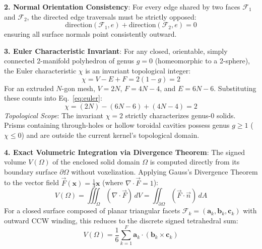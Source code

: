\textbf{2. Normal Orientation Consistency}: For every edge shared by two faces $\mathcal{F}_1$ and $\mathcal{F}_2$, the directed edge traversals must be strictly opposed:
\begin{equation}
\text{direction}(\mathcal{F}_1, e) + \text{direction}(\mathcal{F}_2, e) = 0
\label{eq:orientation_consistency}
\end{equation}
ensuring all surface normals point consistently outward.

\textbf{3. Euler Characteristic Invariant}: For any closed, orientable, simply connected 2-manifold polyhedron of genus $g = 0$ (homeomorphic to a 2-sphere), the Euler characteristic $\chi$ is an invariant topological integer:
\begin{equation}
\chi = V - E + F = 2(1 - g) = 2
\label{eq:euler}
\end{equation}
For an extruded $N$-gon mesh, $V = 2N$, $F = 4N - 4$, and $E = 6N - 6$. Substituting these counts into Eq.~\eqref{eq:euler}:
\begin{equation}
\chi = (2N) - (6N - 6) + (4N - 4) = 2
\label{eq:euler_proof}
\end{equation}
\textit{Topological Scope}: The invariant $\chi = 2$ strictly characterizes genus-0 solids. Prisms containing through-holes or hollow toroidal cavities possess genus $g \ge 1$ ($\chi \le 0$) and are outside the current kernel's topological domain.

\textbf{4. Exact Volumetric Integration via Divergence Theorem}: The signed volume $V(\Omega)$ of the enclosed solid domain $\Omega$ is computed directly from its boundary surface $\partial \Omega$ without voxelization. Applying Gauss's Divergence Theorem to the vector field $\vec{F}(\mathbf{x}) = \frac{1}{3}\mathbf{x}$ (where $\nabla \cdot \vec{F} = 1$):
\begin{equation}
V(\Omega) = \iiint_{\Omega} (\nabla \cdot \vec{F}) \, dV = \iint_{\partial \Omega} (\vec{F} \cdot \vec{n}) \, dA
\label{eq:divergence_theorem}
\end{equation}
For a closed surface composed of planar triangular facets $\mathcal{F}_k = (\mathbf{a}_k, \mathbf{b}_k, \mathbf{c}_k)$ with outward CCW winding, this reduces to the discrete signed tetrahedral sum:
\begin{equation}
V(\Omega) = \frac{1}{6} \sum_{k=1}^{F} \mathbf{a}_k \cdot (\mathbf{b}_k \times \mathbf{c}_k)
\label{eq:divergence_volume}
\end{equation}

